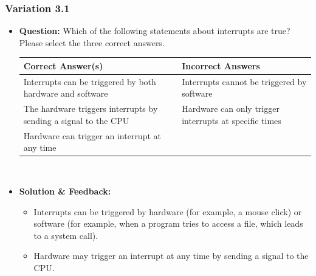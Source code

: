 \subsubsection{Variation 3.1}
\begin{itemize}
    \item \textbf{Question:} Which of the following statements about interrupts are true? Please select the three correct answers.
    
    \begin{tabularx}{\textwidth}{|X|X|}
        \hline
        \textbf{Correct Answer(s)} & \textbf{Incorrect Answers} \\
        \hline
        Interrupts can be triggered by both hardware and software & Interrupts cannot be triggered by software \\
        The hardware triggers interrupts by sending a signal to the CPU & Hardware can only trigger interrupts at specific times \\
        Hardware can trigger an interrupt at any time & \\
        \hline
    \end{tabularx}
   \\ 
    \item \textbf{Solution \& Feedback:}
    \begin{itemize}
        \item Interrupts can be triggered by hardware (for example, a mouse click) or software (for example, when a program tries to access a file, which leads to a system call).
        \item Hardware may trigger an interrupt at any time by sending a signal to the CPU.
    \end{itemize}
\end{itemize}

